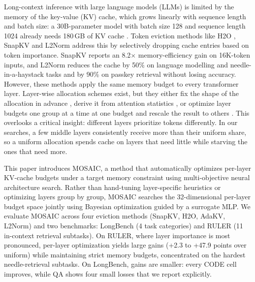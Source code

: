 \documentclass[11pt]{article}
\begin{document}
Long-context inference with large language models (LLMs) is limited by the memory of the key-value (KV) cache, which grows linearly with sequence length and batch size: a 30B-parameter model with batch size 128 and sequence length 1024 already needs 180\,GB of KV cache \citep{zhang2023h2o}. Token eviction methods like H2O \citep{zhang2023h2o}, SnapKV \citep{li2024snapkv} and L2Norm \citep{devoto2024l2norm} address this by selectively dropping cache entries based on token importance. SnapKV reports an 8.2$\times$ memory-efficiency gain on 16K-token inputs, and L2Norm reduces the cache by 50\% on language modelling and needle-in-a-haystack tasks and by 90\% on passkey retrieval without losing accuracy. However, these methods apply the same memory budget to every transformer layer. Layer-wise allocation schemes exist, but they either fix the shape of the allocation in advance \citep{cai2025pyramidkv}, derive it from attention statistics \citep{qin2025cake}, or optimize layer budgets one group at a time at one budget and rescale the result to others \citep{yu2025evolkv}. This overlooks a critical insight: different layers prioritize tokens differently. In our searches, a few middle layers consistently receive more than their uniform share, so a uniform allocation spends cache on layers that need little while starving the ones that need more.

This paper introduces MOSAIC, a method that automatically optimizes per-layer KV-cache budgets under a target memory constraint using multi-objective neural architecture search. Rather than hand-tuning layer-specific heuristics or optimizing layers group by group, MOSAIC searches the 32-dimensional per-layer budget space jointly using Bayesian optimization guided by a surrogate MLP. We evaluate MOSAIC across four eviction methods (SnapKV, H2O, AdaKV, L2Norm) and two benchmarks: LongBench (4 task categories) and RULER (11 in-context retrieval subtasks). On RULER, where layer importance is most pronounced, per-layer optimization yields large gains (+2.3 to +47.9 points over uniform) while maintaining strict memory budgets, concentrated on the hardest needle-retrieval subtasks. On LongBench, gains are smaller: every CODE cell improves, while QA shows four small losses that we report explicitly.
\end{document}
